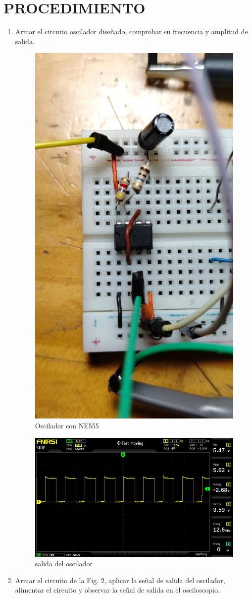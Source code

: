 \newpage
\section{PROCEDIMIENTO}
\begin{enumerate} [label={\alph*.}]
    \item Armar el circuito oscilador diseñado, comprobar su frecuencia y amplitud de salida.
    \begin{figure}[H]
        \centering
        \includegraphics[width=.35\textwidth]{imgs/5.1. Circuito.jpg}
        \caption{Oscilador con NE555}
    \end{figure}
    \begin{figure}[H]
        \centering
        \includegraphics[width=.9\textwidth]{imgs/5.1. Osciloscopio del circuito.jpg}
        \caption{salida del oscilador}
    \end{figure}
    \item Armar el circuito de la Fig. 2, aplicar la señal de salida del oscilador, alimentar el circuito y observar la señal de salida en el osciloscopio.

\end{enumerate}
